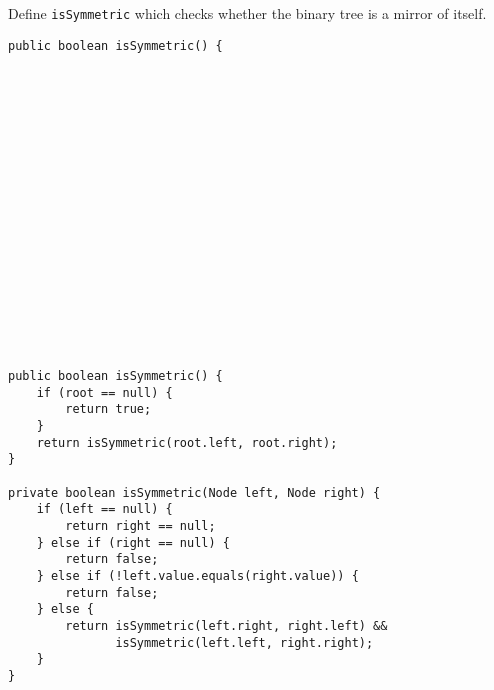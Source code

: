 \question Define \texttt{isSymmetric} which checks whether the binary tree is a mirror of itself.

\ifprintanswers\else
\begin{lstlisting}
public boolean isSymmetric() {



















\end{lstlisting}
\fi

\begin{solution}
\begin{lstlisting}
public boolean isSymmetric() {
    if (root == null) {
        return true;
    }
    return isSymmetric(root.left, root.right);
}

private boolean isSymmetric(Node left, Node right) {
    if (left == null) {
        return right == null;
    } else if (right == null) {
        return false;
    } else if (!left.value.equals(right.value)) {
        return false;
    } else {
        return isSymmetric(left.right, right.left) &&
               isSymmetric(left.left, right.right);
    }
}
\end{lstlisting}
\end{solution}
